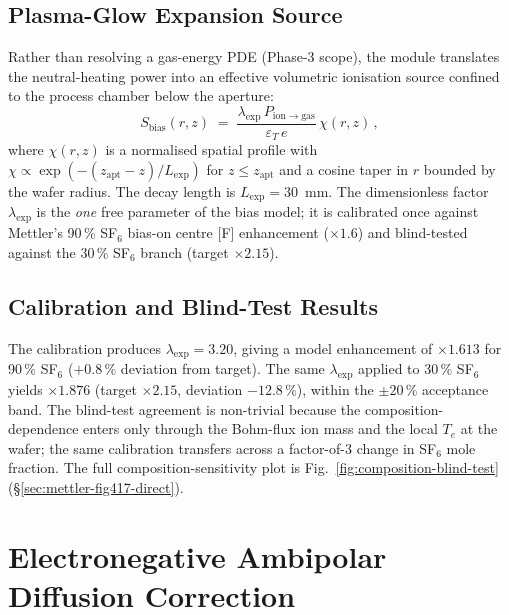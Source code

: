 \documentclass[11pt,a4paper]{report}
\begin{document}
\subsection{Plasma-Glow Expansion Source}

Rather than resolving a gas-energy PDE (Phase-3 scope), the module translates the neutral-heating power into an effective volumetric ionisation source confined to the process chamber below the aperture:
\begin{equation}
  S_\mathrm{bias}(r,z) \;=\; \frac{\lambda_\mathrm{exp}\,P_\mathrm{ion\to gas}}{\varepsilon_T\,e}\,\chi(r,z)\,,
  \label{eq:Sbias}
\end{equation}
where $\chi(r,z)$ is a normalised spatial profile with $\chi \propto \exp(-(z_\mathrm{apt}-z)/L_\mathrm{exp})$ for $z \le z_\mathrm{apt}$ and a cosine taper in $r$ bounded by the wafer radius.  The decay length is $L_\mathrm{exp} = 30$~mm.  The dimensionless factor $\lambda_\mathrm{exp}$ is the \emph{one} free parameter of the bias model; it is calibrated once against Mettler's 90\,\% SF$_6$ bias-on centre [F] enhancement ($\times 1.6$) and blind-tested against the 30\,\% SF$_6$ branch (target $\times 2.15$).

\subsection{Calibration and Blind-Test Results}

The calibration produces $\lambda_\mathrm{exp} = 3.20$, giving a model enhancement of $\times 1.613$ for 90\,\% SF$_6$ ($+0.8\,\%$ deviation from target).  The same $\lambda_\mathrm{exp}$ applied to 30\,\% SF$_6$ yields $\times 1.876$ (target $\times 2.15$, deviation $-12.8\,\%$), within the $\pm 20\,\%$ acceptance band.  The blind-test agreement is non-trivial because the composition-dependence enters only through the Bohm-flux ion mass and the local $T_e$ at the wafer; the same calibration transfers across a factor-of-3 change in SF$_6$ mole fraction.  The full composition-sensitivity plot is Fig.~\ref{fig:composition-blind-test} (\S\ref{sec:mettler-fig417-direct}).


\section{Electronegative Ambipolar Diffusion Correction}
\label{sec:electronegative-ambipolar}
\end{document}
